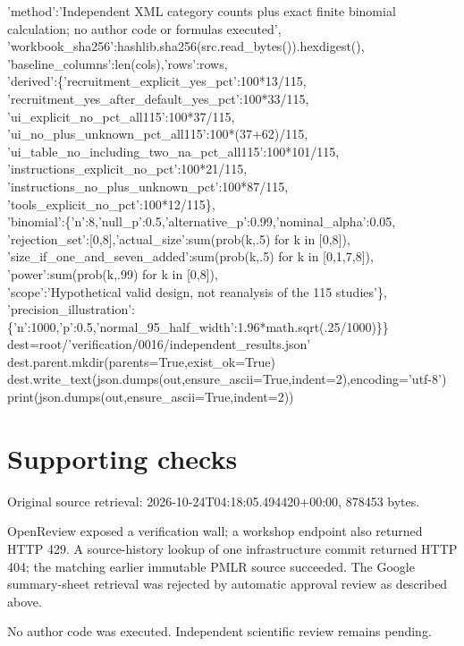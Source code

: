 \documentclass[10pt]{article}
\begin{document}
{     'method':'Independent XML category counts plus exact finite binomial calculation; no author code or formulas executed',\\
     'workbook\_sha256':hashlib.sha256(src.read\_bytes()).hexdigest(),\\
     'baseline\_columns':len(cols),'rows':rows,\\
     'derived':\{'recruitment\_explicit\_yes\_pct':100*13/115,\\
       'recruitment\_yes\_after\_default\_yes\_pct':100*33/115,\\
       'ui\_explicit\_no\_pct\_all115':100*37/115,\\
       'ui\_no\_plus\_unknown\_pct\_all115':100*(37+62)/115,\\
       'ui\_table\_no\_including\_two\_na\_pct\_all115':100*101/115,\\
       'instructions\_explicit\_no\_pct':100*21/115,\\
       'instructions\_no\_plus\_unknown\_pct':100*87/115,\\
       'tools\_explicit\_no\_pct':100*12/115\},\\
     'binomial':\{'n':8,'null\_p':0.5,'alternative\_p':0.99,'nominal\_alpha':0.05,\\
       'rejection\_set':[0,8],'actual\_size':sum(prob(k,.5) for k in [0,8]),\\
       'size\_if\_one\_and\_seven\_added':sum(prob(k,.5) for k in [0,1,7,8]),\\
       'power':sum(prob(k,.99) for k in [0,8]),\\
       'scope':'Hypothetical valid design, not reanalysis of the 115 studies'\},\\
     'precision\_illustration':\{'n':1000,'p':0.5,'normal\_95\_half\_width':1.96*math.sqrt(.25/1000)\}\}\\
dest=root/'verification/0016/independent\_results.json'\\
dest.parent.mkdir(parents=True,exist\_ok=True)\\
dest.write\_text(json.dumps(out,ensure\_ascii=True,indent=2),encoding='utf-8')\\
print(json.dumps(out,ensure\_ascii=True,indent=2))}\par
\section*{Supporting checks}
Original source retrieval: 2026-10-24T04:18:05.494420+00:00, 878453 bytes.\par
OpenReview exposed a verification wall; a workshop endpoint also returned HTTP 429. A source-history lookup of one infrastructure commit returned HTTP 404; the matching earlier immutable PMLR source succeeded. The Google summary-sheet retrieval was rejected by automatic approval review as described above.\par
No author code was executed. Independent scientific review remains pending.\par
\end{document}
